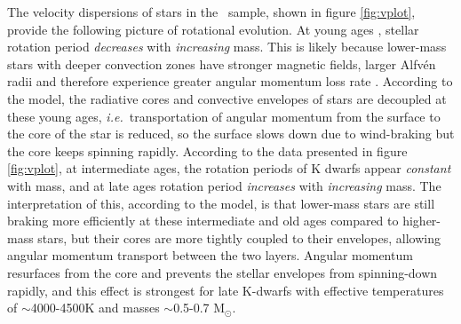 \documentclass{aastex63}
\newcommand{\ie}{{\it i.e.}}
\newcommand{\eg}{{\it e.g.}}
\newcommand{\mct}{\citet{mcquillan2014}}
\newcommand{\racomment}[1]{{\color{blue}#1}}
\begin{document}
The velocity dispersions of stars in the \mct\ sample, shown in figure
\ref{fig:vplot}, provide the following picture of rotational evolution.
At young ages \citep[younger than around 1 Gyr but still old enough to be on
the main sequence and have transitioned from the `C' sequence to the `I'
sequence ][]{barnes2003}, stellar rotation period {\it decreases} with {\it
increasing} mass.
This is likely because lower-mass stars with deeper convection zones have
stronger magnetic fields, larger Alfv\'en radii and therefore experience
greater angular momentum loss rate \citep[\eg][]{schatzman1962, kraft1967,
parker1970, kawaler1988, charbonneau2010, matt2012, matt2015}.
According to the \citet{spada2019} model, the radiative cores and convective
envelopes of stars are decoupled at these young ages, \ie\ transportation of
angular momentum from the surface to the core of the star is reduced, so the
surface slows down due to wind-braking but the core keeps spinning rapidly.
According to the data presented in figure \ref{fig:vplot}, at intermediate
ages, the rotation periods of K dwarfs appear {\it constant} with mass, and at
late ages rotation period {\it increases} with {\it increasing} mass.
The interpretation of this, according to the \citet{spada2019} model, is that
lower-mass stars are still braking more efficiently at these intermediate and
old ages \racomment{compared to higher-mass stars}, but their cores are more
tightly coupled to their envelopes, allowing angular momentum transport
between the two layers.
Angular momentum resurfaces \racomment{from the core} and prevents the stellar
envelopes from spinning-down rapidly, and this effect is strongest for late
K-dwarfs with effective temperatures of $\sim$4000-4500K and masses
$\sim$0.5-0.7 M$_\odot$.
\end{document}
